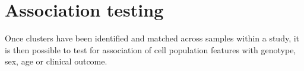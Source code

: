 
%
%


\section{Association testing}

Once clusters have been identified and matched across samples within a study, it is then possible to test for association of cell population
features with genotype, sex, age or clinical outcome.

